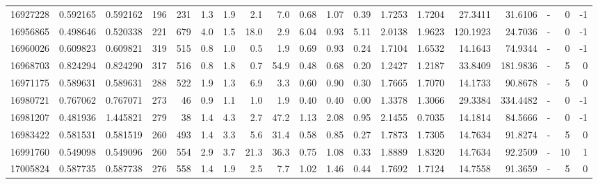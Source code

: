 \begin{tabular}{rrrrrrrrrrrrrrrrlrr}
  16927228 & 0.592165 &   0.592162 &  196 &  231 &      1.3 &      1.9 &     2.1 &      7.0 &       0.68 &        1.07 &        0.39 &  1.7253 &  1.7204 &   27.3411 &   31.6106 &             - &        0 &         -1 \\
  16956865 & 0.498646 &   0.520338 &  221 &  679 &      4.0 &      1.5 &    18.0 &      2.9 &       6.04 &        0.93 &        5.11 &  2.0138 &  1.9623 &  120.1923 &   24.7036 &             - &        0 &         -1 \\
  16960026 & 0.609823 &   0.609821 &  319 &  515 &      0.8 &      1.0 &     0.5 &      1.9 &       0.69 &        0.93 &        0.24 &  1.7104 &  1.6532 &   14.1643 &   74.9344 &             - &        0 &         -1 \\
  16968703 & 0.824294 &   0.824290 &  317 &  516 &      0.8 &      1.8 &     0.7 &     54.9 &       0.48 &        0.68 &        0.20 &  1.2427 &  1.2187 &   33.8409 &  181.9836 &             - &        5 &          0 \\
  16971175 & 0.589631 &   0.589631 &  288 &  522 &      1.9 &      1.3 &     6.9 &      3.3 &       0.60 &        0.90 &        0.30 &  1.7665 &  1.7070 &   14.1733 &   90.8678 &             - &        5 &          0 \\
  16980721 & 0.767062 &   0.767071 &  273 &   46 &      0.9 &      1.1 &     1.0 &      1.9 &       0.40 &        0.40 &        0.00 &  1.3378 &  1.3066 &   29.3384 &  334.4482 &             - &        0 &         -1 \\
  16981207 & 0.481936 &   1.445821 &  279 &   38 &      1.4 &      4.3 &     2.7 &     47.2 &       1.13 &        2.08 &        0.95 &  2.1455 &  0.7035 &   14.1814 &   84.5666 &             - &        0 &         -1 \\
  16983422 & 0.581531 &   0.581519 &  260 &  493 &      1.4 &      3.3 &     5.6 &     31.4 &       0.58 &        0.85 &        0.27 &  1.7873 &  1.7305 &   14.7634 &   91.8274 &             - &        5 &          0 \\
  16991760 & 0.549098 &   0.549096 &  260 &  554 &      2.9 &      3.7 &    21.3 &     36.3 &       0.75 &        1.08 &        0.33 &  1.8889 &  1.8320 &   14.7634 &   92.2509 &             - &       10 &          1 \\
  17005824 & 0.587735 &   0.587738 &  276 &  558 &      1.4 &      1.9 &     2.5 &      7.7 &       1.02 &        1.46 &        0.44 &  1.7692 &  1.7124 &   14.7558 &   91.3659 &             - &        5 &          0 \\

\end{tabular}
